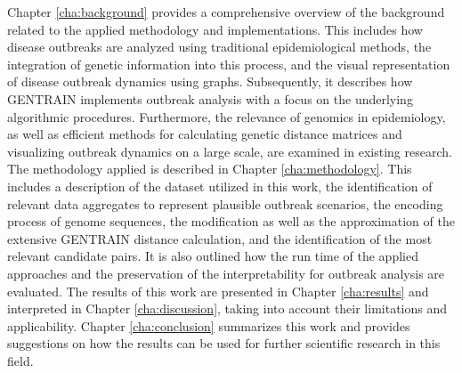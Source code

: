 Chapter \ref{cha:background} provides a comprehensive overview of the background related to the applied methodology and implementations. This includes how disease outbreaks are analyzed using traditional epidemiological methods, the integration of genetic information into this process, and the visual representation of disease outbreak dynamics using graphs. Subsequently, it describes how GENTRAIN implements outbreak analysis with a focus on the underlying algorithmic procedures. Furthermore, the relevance of genomics in epidemiology, as well as efficient methods for calculating genetic distance matrices and visualizing outbreak dynamics on a large scale, are examined in existing research.
The methodology applied is described in Chapter \ref{cha:methodology}. This includes a description of the dataset utilized in this work, the identification of relevant data aggregates to represent plausible outbreak scenarios, the encoding process of genome sequences, the modification as well as the approximation of the extensive GENTRAIN distance calculation, and the identification of the most relevant candidate pairs. It is also outlined how the run time of the applied approaches and the preservation of the interpretability for outbreak analysis are evaluated.
The results of this work are presented in Chapter \ref{cha:results} and interpreted in Chapter \ref{cha:discussion}, taking into account their limitations and applicability. Chapter \ref{cha:conclusion} summarizes this work and provides suggestions on how the results can be used for further scientific research in this field.